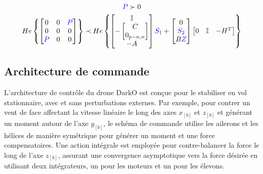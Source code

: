 \begin{equation}
\centering
    \begin{gathered}
        \textcolor{blue}{P} \succ 0 \\
        He\left\{ \begin{bmatrix}
            0 & 0 & \textcolor{blue}{P}\\
            0 & 0 & 0\\
            \textcolor{blue}{P} & 0 & 0
        \end{bmatrix}\right\}
    \prec
    He\left\{\begin{bmatrix}
            \mathbb{I}\\
                -\begin{bmatrix}
                    C \\
                    0_{p-n,n}
                \end{bmatrix}\\
            -A
    \end{bmatrix}
    \textcolor{blue}{S_1} +
    \begin{bmatrix}
        0\\
        \textcolor{blue}{S_2}\\
        B\textcolor{blue}{Z}
    \end{bmatrix}
    \begin{bmatrix}
        0 & \mathbb{I} & -H^T
    \end{bmatrix}\right\}
    \end{gathered}
    \label{ValidMatrixIneq}
\end{equation}


\subsection{Architecture de commande}
\label{3b}


L'architecture de contrôle du drone DarkO est conçue pour le stabiliser en vol stationnaire, avec et sans perturbations externes. Par exemple, pour contrer un vent de face affectant la vitesse linéaire le long des axes $x_{[b]}$ et $z_{[b]}$ et générant un moment autour de l'axe $y_{[b]}$, le schéma de commande utilise les ailerons et les hélices de manière symétrique pour générer un moment et une force compensatoires. Une action intégrale est employée pour contre-balancer la force le long de l'axe $z_{[b]}$, assurant une convergence asymptotique vers la force désirée en utilisant deux intégrateurs, un pour les moteurs et un pour les élevons.


